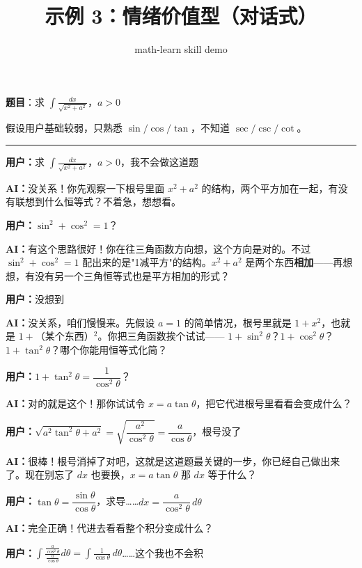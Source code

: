 \documentclass[12pt,a4paper]{ctexart}
\title{示例 3：情绪价值型（对话式）}
\author{math-learn skill demo}
\date{}
\newcommand{\userline}[1]{\medskip\noindent\textcolor{usercolor}{\textbf{用户：}}#1}
\newcommand{\ailine}[1]{\medskip\noindent\textcolor{aicolor}{\textbf{AI：}}#1}
\begin{document}
\maketitle

\noindent{}

\bigskip

\noindent\textbf{题目}：求 $\displaystyle\int\frac{dx}{\sqrt{x^2+a^2}}$，$a>0$

\medskip
\noindent 假设用户基础较弱，只熟悉 $\sin/\cos/\tan$，不知道 $\sec/\csc/\cot$。

\bigskip
\hrule
\bigskip

\userline{求 $\displaystyle\int\frac{dx}{\sqrt{x^2+a^2}}$，$a>0$，我不会做这道题}

\ailine{没关系！你先观察一下根号里面 $x^2 + a^2$ 的结构，两个平方加在一起，有没有联想到什么恒等式？不着急，想想看。}

\userline{$\sin^2+\cos^2=1$？}

\ailine{有这个思路很好！你在往三角函数方向想，这个方向是对的。不过 $\sin^2+\cos^2=1$ 配出来的是"1减平方"的结构。$x^2+a^2$ 是两个东西\textbf{相加}——再想想，有没有另一个三角恒等式也是平方相加的形式？}

\userline{没想到}

\ailine{没关系，咱们慢慢来。先假设 $a=1$ 的简单情况，根号里就是 $1+x^2$，也就是 $1+$（某个东西）$^2$。你把三角函数挨个试试—— $1+\sin^2\theta$？$1+\cos^2\theta$？$1+\tan^2\theta$？哪个你能用恒等式化简？}

\userline{$1+\tan^2\theta = \dfrac{1}{\cos^2\theta}$？}

\ailine{对的就是这个！那你试试令 $x = a\tan\theta$，把它代进根号里看看会变成什么？}

\userline{$\sqrt{a^2\tan^2\theta + a^2} = \sqrt{\dfrac{a^2}{\cos^2\theta}} = \dfrac{a}{\cos\theta}$，根号没了}

\ailine{很棒！根号消掉了对吧，这就是这道题最关键的一步，你已经自己做出来了。现在别忘了 $dx$ 也要换，$x=a\tan\theta$ 那 $dx$ 等于什么？}

\userline{$\tan\theta = \dfrac{\sin\theta}{\cos\theta}$，求导……$dx = \dfrac{a}{\cos^2\theta}\,d\theta$}

\ailine{完全正确！代进去看看整个积分变成什么？}

\userline{$\displaystyle\int\frac{\frac{a}{\cos^2\theta}}{\frac{a}{\cos\theta}}d\theta = \int\frac{1}{\cos\theta}\,d\theta$……这个我也不会积}
\end{document}
